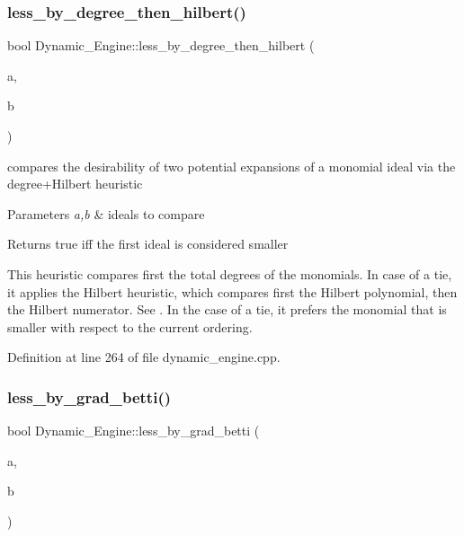\subsubsection{\texorpdfstring{less\+\_\+by\+\_\+degree\+\_\+then\+\_\+hilbert()}{less\_by\_degree\_then\_hilbert()}}
{\footnotesize\ttfamily bool Dynamic\+\_\+\+Engine\+::less\+\_\+by\+\_\+degree\+\_\+then\+\_\+hilbert (\begin{DoxyParamCaption}\item[{\hyperlink{group___g_b_computation_class_dynamic___engine_1_1_p_p___with___ideal}{P\+P\+\_\+\+With\+\_\+\+Ideal} \&}]{a,  }\item[{\hyperlink{group___g_b_computation_class_dynamic___engine_1_1_p_p___with___ideal}{P\+P\+\_\+\+With\+\_\+\+Ideal} \&}]{b }\end{DoxyParamCaption})}



compares the desirability of two potential expansions of a monomial ideal via the degree+\+Hilbert heuristic 


\begin{DoxyParams}{Parameters}
{\em a,b} & ideals to compare \\
\hline
\end{DoxyParams}
\begin{DoxyReturn}{Returns}
{\ttfamily true} iff the first ideal is considered smaller
\end{DoxyReturn}
This heuristic compares first the total degrees of the monomials. In case of a tie, it applies the Hilbert heuristic, which compares first the Hilbert polynomial, then the Hilbert numerator. See \cite{CaboaraDynAlg}. In the case of a tie, it prefers the monomial that is smaller with respect to the current ordering. 

Definition at line 264 of file dynamic\+\_\+engine.\+cpp.

\mbox{\label{namespace_dynamic___engine_a8c67515d04de029583ba590b2ca4d6e4}} 
\subsubsection{\texorpdfstring{less\+\_\+by\+\_\+grad\+\_\+betti()}{less\_by\_grad\_betti()}}
{\footnotesize\ttfamily bool Dynamic\+\_\+\+Engine\+::less\+\_\+by\+\_\+grad\+\_\+betti (\begin{DoxyParamCaption}\item[{\hyperlink{group___g_b_computation_class_dynamic___engine_1_1_p_p___with___ideal}{P\+P\+\_\+\+With\+\_\+\+Ideal} \&}]{a,  }\item[{\hyperlink{group___g_b_computation_class_dynamic___engine_1_1_p_p___with___ideal}{P\+P\+\_\+\+With\+\_\+\+Ideal} \&}]{b }\end{DoxyParamCaption})}



